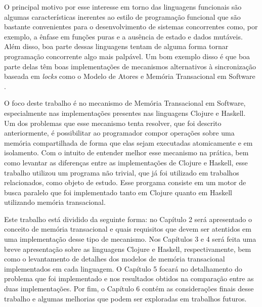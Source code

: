 O principal motivo por esse interesse em torno das linguagens funcionais são algumas características inerentes ao estilo de programação funcional que são bastante convenientes para o desenvolvimento de sistemas concorrentes como, por exemplo, a ênfase em funções puras e a ausência de estado e dados mutáveis. Além disso, boa parte dessas linguagens tentam de alguma forma tornar programação concorrente algo mais palpável. Um bom exemplo disso é que boa parte delas têm boas implementações de mecanismos alternativos à sincronização baseada em \emph{locks} como o Modelo de Atores \cite{agha1986actors} e Memória Transacional em Software \cite{shavit1995software}.

O foco deste trabalho é no mecanismo de Memória Transacional em Software, especialmente nas implementações presentes nas linguagens Clojure e Haskell. Um dos problemas que esse mecanismo  tenta resolver, que foi descrito anteriormente, é possibilitar ao programador compor operações sobre uma memória compartilhada de forma que elas sejam executadas atomicamente e em isolamento. Com o intuito de entender melhor esse mecanismo na prática, bem como levantar as diferenças entre as implementações de Clojure e Haskell, esse trabalho utilizou um programa não trivial, que já foi utilizado em trabalhos relacionados, como objeto de estudo. Esse prorgama consiste em um motor de busca paralelo que foi implementado tanto em Clojure quanto em Haskell utilizando memória transacional. 

Este trabalho está dividido da seguinte forma: no Capítulo 2 será apresentado o conceito de memória transacional e quais requisitos que devem ser atentidos em uma implementação desse tipo de mecanismo. Nos Capítulos 3 e 4 será feita uma breve apresentação sobre as linguagens Clojure e Haskell, respectivamente, bem como o levantamento de detalhes dos modelos de memória transacional implementados em cada linguagem. O Capítulo 5 focará no detalhamento do problema que foi implementado e nos resultados obtidos na comparação entre as duas implementações. Por fim, o Capítulo 6 contém as considerações finais desse trabalho e algumas melhorias que podem ser exploradas em trabalhos futuros.